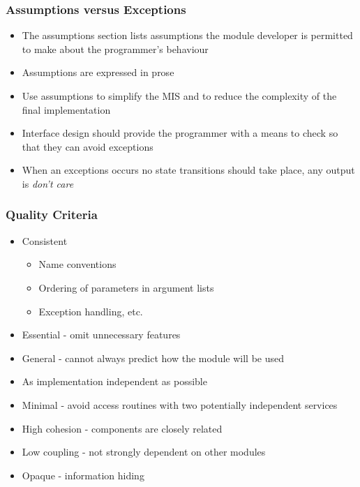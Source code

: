 \documentclass[t,12pt,numbers,fleqn,handout]{beamer}
\begin{document}

\begin{frame}

\frametitle{Assumptions versus Exceptions}

\begin{itemize}
\item The assumptions section lists assumptions the module developer is permitted to make about the programmer's behaviour
\item Assumptions are expressed in prose
\item Use assumptions to simplify the MIS and to reduce the complexity of the final implementation
\item Interface design should provide the programmer with a means to check so that they can avoid exceptions
\item When an exceptions occurs no state transitions should take place, any output is {\it don't care}
\end{itemize}

\end{frame}


\begin{frame}

\frametitle{Quality Criteria}

\begin{itemize}
\item Consistent
\begin{itemize}
\item Name conventions
\item Ordering of parameters in argument lists
\item Exception handling, etc.
\end{itemize}
\item Essential - omit unnecessary features
\item General - cannot always predict how the module will be used
\item As implementation independent as possible
\item Minimal - avoid access routines with two potentially independent services
\item High cohesion - components are closely related
\item Low coupling - not strongly dependent on other modules
\item Opaque - information hiding
\end{itemize}

\end{frame}
\end{document}
